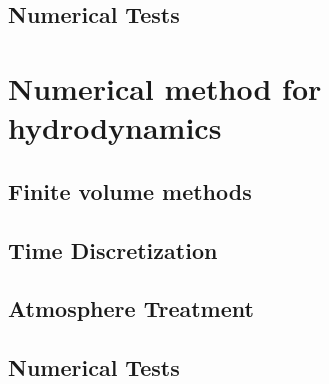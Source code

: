 \subsection{Numerical Tests} %
\label{section4.1.7}

\section{Numerical method for hydrodynamics} %
\label{section4.2}

\subsection{Finite volume methods} %
\label{section4.2.1}

\subsection{Time Discretization} %
\label{section4.2.2}

\subsection{Atmosphere Treatment} %
\label{section4.2.3}

\subsection{Numerical Tests} %
\label{section4.2.4}

